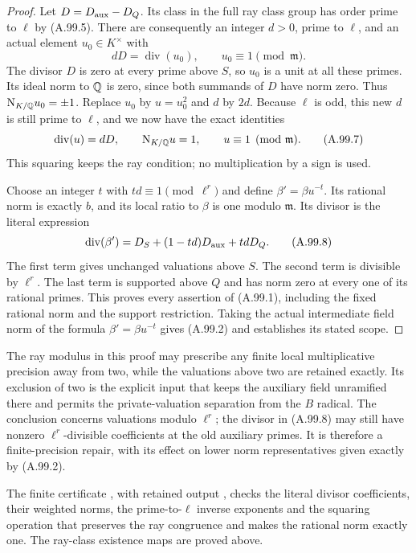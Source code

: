 \begin{proof}
Let $D=D_{\rm aux}-D_Q$.
Its class in the full ray class group has order prime
to $\ell$ by (A.99.5).
There are consequently an integer $d>0$, prime to
$\ell$, and an actual element $u_0\in K^\times$ with
\[
              dD=\operatorname{div}(u_0),
                         \qquad u_0\equiv1\pmod{\mathfrak m}.
 \tag{A.99.6}
\]
The divisor $D$ is zero at every prime above $S$,
so $u_0$ is a unit at all these primes.
Its ideal norm to $\mathbb Q$ is zero, since both summands
of $D$ have norm zero.
Thus $\mathrm N_{K/\mathbb Q}u_0=\pm1$.
Replace $u_0$ by $u=u_0^2$ and $d$ by $2d$.
Because $\ell$ is odd, this new $d$ is still prime to
$\ell$, and we now have the exact identities
\[
       \operatorname{div}(u)=dD,\qquad
       \mathrm N_{K/\mathbb Q}u=1,\qquad u\equiv1\pmod{\mathfrak m}.
 \tag{A.99.7}
\]
This squaring keeps the ray condition; no multiplication
by a sign is used.

Choose an integer $t$ with $td\equiv1\pmod{\ell^r}$
and define $\beta'=\beta u^{-t}$.
Its rational norm is exactly $b$, and its local ratio
to $\beta$ is one modulo $\mathfrak m$.
Its divisor is the literal expression
\[
 \operatorname{div}(\beta')
           =D_S+(1-td)D_{\rm aux}+tdD_Q.
 \tag{A.99.8}
\]
The first term gives unchanged valuations above $S$.
The second term is divisible by $\ell^r$.
The last term is supported above $Q$ and has norm zero
at every one of its rational primes.
This proves every assertion of (A.99.1), including
the fixed rational norm and the support restriction.
Taking the actual intermediate field norm of the
formula $\beta'=\beta u^{-t}$ gives (A.99.2) and
establishes its stated scope.
\end{proof}

The ray modulus in this proof may prescribe any finite
local multiplicative precision away from two, while
the valuations above two are retained exactly.
Its exclusion of two is the explicit input that keeps
the auxiliary field unramified there and permits the
private-valuation separation from the $B$ radical.
The conclusion concerns valuations modulo $\ell^r$;
the divisor in (A.99.8) may still have nonzero
$\ell^r$-divisible coefficients at the old auxiliary
primes.  It is therefore a finite-precision repair,
with its effect on lower norm representatives given
exactly by (A.99.2).

\noindent The finite certificate
, with retained output
, checks the
literal divisor coefficients, their weighted norms, the
prime-to-$\ell$ inverse exponents and the squaring operation
that preserves the ray congruence and makes the rational norm
exactly one.  The ray-class existence maps are proved above.
